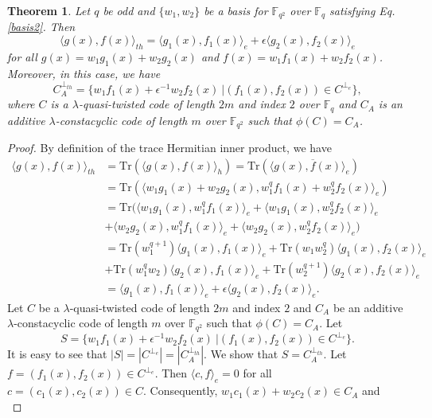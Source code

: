 \documentclass[12 pt]{extarticle}
\numberwithin{equation}{section}
\newtheorem{theorem}{Theorem}[section]
\theoremstyle{definition}
\begin{document}
\begin{theorem} \label{oddth}
Let $q$ be odd and $\{w_1,w_2\}$ be a basis for $\mathbb{F}_{q^2}$ over $\mathbb{F}_q$ satisfying Eq. \ref{basis2}. Then
 $$\langle g(x),f(x)\rangle_{th}=\langle g_1(x),f_1(x)\rangle_e+\epsilon \langle g_2(x),f_2(x)\rangle_e$$
 for all $g(x)=w_1g_1(x)+w_2g_2(x)$ and $f(x)=w_1f_1(x)+w_2f_2(x)$. Moreover, in this case, we have  $$C_A^{\perp_{th}}=\{w_1f_1(x)+\epsilon^{-1}w_2f_2(x)\ | (f_1(x),f_2(x))\in C^{\perp_e}\},$$
where $C$ is a $\lambda$-quasi-twisted code of length $2m$ and index $2$ over $\mathbb{F}_q$ and $C_A$ is an additive $\lambda$-constacyclic code of length $m$ over $\mathbb{F}_{q^2}$ such that  $\phi(C)=C_A$.
\end{theorem}
\begin{proof}
     By definition of the trace Hermitian inner product, we have 
    \begin{equation*}
        \begin{split}
         \langle g(x),f(x)\rangle_{th}&=\text{Tr}(\langle g(x),f(x)\rangle_h)=\text{Tr}(\langle g(x),\overline{f}(x)\rangle_e)\\
         &=\text{Tr}(\langle w_1g_1(x)+w_2g_2(x),w_1^qf_1(x)+w_2^qf_2(x)\rangle_e)\\
         &=\text{Tr}(\langle w_1g_1(x),w_1^qf_1(x)\rangle_e +\langle w_1g_1(x),w_2^qf_2(x)\rangle_e\\
    &+\langle w_2g_2(x),w_1^qf_1(x)\rangle_e+\langle w_2g_2(x),w_2^qf_2(x)\rangle_e)\\
    &=\text{Tr}(w_1^{q+1})\langle g_1(x),f_1(x)\rangle_e +\text{Tr}(w_1w_2^q)\langle g_1(x),f_2(x)\rangle_e\\
    &+\text{Tr}(w_1^qw_2)\langle g_2(x),f_1(x)\rangle_e+\text{Tr}(w_2^{q+1})\langle g_2(x),f_2(x)\rangle_e\\
    &=\langle g_1(x),f_1(x)\rangle_e+\epsilon\langle g_2(x),f_2(x)\rangle_e.
        \end{split}
    \end{equation*}
   Let $C$ be a $\lambda$-quasi-twisted code of length $2m$ and index $2$ and  $C_A$ be an additive $\lambda$-constacyclic code of length $m$ over $\mathbb{F}_{q^2}$ such that $\phi(C)=C_A$. Let 
   $$S=\{w_1f_1(x)+\epsilon^{-1}w_2f_2(x)\ | (f_1(x),f_2(x))\in C^{\perp_e}\}.$$   
It is easy to see that $|S|=|C^{\perp_e}|=|C_A^{\perp_{th}}|$. We show that $S=C_A^{\perp_{th}}$.  Let $f=(f_1(x),f_2(x))\in C^{\perp_e}$. Then $\langle c,f\rangle_e=0$ for all $c=(c_1(x),c_2(x))\in C$. Consequently,  $w_1c_1(x)+w_2c_2(x)\in C_A$ and 
   \begin{equation*}

\end{equation*}
\end{proof}
\end{document}
